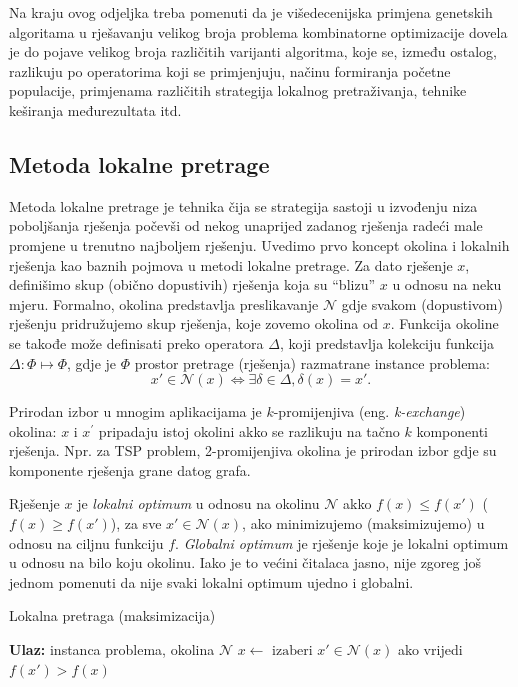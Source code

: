 \documentclass[a4paper, utf8, 11pt, colorlinks]{book}
\begin{document}
Na kraju ovog odjeljka treba pomenuti da je višedecenijska primjena genetskih algoritama u rješavanju velikog broja problema kombinatorne optimizacije dovela je do pojave velikog broja različitih varijanti algoritma, koje se, između ostalog, razlikuju po operatorima koji se primjenjuju, načinu formiranja početne populacije, primjenama različitih strategija lokalnog pretraživanja, tehnike keširanja međurezultata itd. 

 
\subsection{Metoda lokalne pretrage}\label{sec: local_search}

Metoda lokalne pretrage je tehnika čija se strategija sastoji u izvođenju niza poboljšanja  rješenja počevši od nekog unaprijed zadanog rješenja radeći male promjene u trenutno najboljem rješenju. Uvedimo prvo koncept okolina i lokalnih rješenja kao baznih pojmova u metodi lokalne pretrage. Za dato rješenje $x$, definišimo skup (obično dopustivih) rješenja koja su ``blizu'' $x$ u odnosu na neku mjeru. Formalno, okolina predstavlja preslikavanje  $\mathcal{N}$ gdje svakom (dopustivom) rješenju pridružujemo skup rješenja, koje zovemo okolina od $x$.  Funkcija okoline se takođe može definisati preko operatora  $\Delta$, koji predstavlja kolekciju   funkcija $\Delta:\Phi \mapsto \Phi$,  gdje je $\Phi$ prostor pretrage (rješenja) razmatrane instance problema:
$$ x' \in \mathcal{N}(x) \Longleftrightarrow \exists \delta \in \Delta,\delta(x)=x'.$$
 
Prirodan izbor u mnogim aplikacijama je $k$-promijenjiva (eng. \emph{k-exchange}) okolina: $x$ i $x^{'}$ pripadaju istoj okolini akko se razlikuju na tačno $k$ komponenti rješenja. Npr. za TSP problem, 2-promijenjiva okolina je prirodan izbor gdje su komponente rješenja grane datog grafa.  

  
Rješenje $x$ je \emph{lokalni optimum} u odnosu na okolinu $\mathcal{N}$ akko
$f(x) \leq f(x')$ ($f(x) \geq f(x')$), za sve $x' \in \mathcal{N}(x)$, ako minimizujemo (maksimizujemo) u odnosu na ciljnu funkciju $f$.  \emph{Globalni optimum} je rješenje koje je lokalni optimum u odnosu na bilo koju okolinu.  Iako je to većini čitalaca jasno, nije zgoreg  još jednom pomenuti da nije svaki lokalni optimum ujedno i globalni. 

\begin{algorithm}[!t] 
	\caption{Lokalna pretraga (maksimizacija)}\label{alg:ls}
	\begin{algorithmic}[1]
		\STATE \textbf{Ulaz:} instanca problema, okolina $\mathcal{N}$
		\STATE $ x \gets  \text{ izaberi } x' \in \mathcal{N}(x) $ ako vrijedi  $f(x') > f(x)$ 
		\ENDWHILE
	\end{algorithmic}
\end{algorithm}
\end{document}
